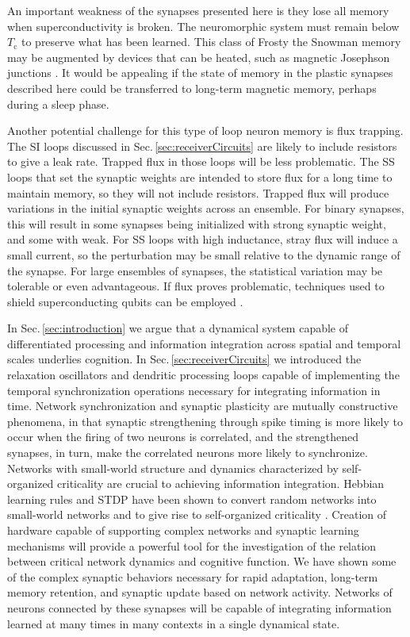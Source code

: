 \documentclass[twocolumn]{article}
\begin{document}
An important weakness of the synapses presented here is they lose all memory when superconductivity is broken. The neuromorphic system must remain below $T_{\mathrm{c}}$ to preserve what has been learned. This class of Frosty the Snowman memory may be augmented by devices that can be heated, such as magnetic Josephson junctions \cite{ru2016,scdo2017,scdo2018}. It would be appealing if the state of memory in the plastic synapses described here could be transferred to long-term magnetic memory, perhaps during a sleep phase.

Another potential challenge for this type of loop neuron memory is flux trapping. The SI loops discussed in Sec.\,\ref{sec:receiverCircuits} are likely to include resistors to give a leak rate. Trapped flux in those loops will be less problematic. The SS loops that set the synaptic weights are intended to store flux for a long time to maintain memory, so they will not include resistors. Trapped flux will produce variations in the initial synaptic weights across an ensemble. For binary synapses, this will result in some synapses being initialized with strong synaptic weight, and some with weak. For SS loops with high inductance, stray flux will induce a small current, so the perturbation may be small relative to the dynamic range of the synapse. For large ensembles of synapses, the statistical variation may be tolerable or even advantageous. If flux proves problematic, techniques used to shield superconducting qubits can be employed \cite{coch2011}.

In Sec.\,\ref{sec:introduction} we argue that a dynamical system capable of differentiated processing and information integration across spatial and temporal scales underlies cognition. In Sec.\,\ref{sec:receiverCircuits} we introduced the relaxation oscillators and dendritic processing loops capable of implementing the temporal synchronization operations necessary for integrating information in time. Network synchronization and synaptic plasticity are mutually constructive phenomena, in that synaptic strengthening through spike timing is more likely to occur when the firing of two neurons is correlated, and the strengthened synapses, in turn, make the correlated neurons more likely to synchronize. Networks with small-world structure \cite{wast1998,sp2010} and dynamics characterized by self-organized criticality are crucial to achieving information integration. Hebbian learning rules and STDP have been shown to convert random networks into small-world networks and to give rise to self-organized criticality \cite{siqu2007,rusp2011}. Creation of hardware capable of supporting complex networks and synaptic learning mechanisms will provide a powerful tool for the investigation of the relation between critical network dynamics and cognitive function. We have shown some of the complex synaptic behaviors necessary for rapid adaptation, long-term memory retention, and synaptic update based on network activity. Networks of neurons connected by these synapses will be capable of integrating information learned at many times in many contexts in a single dynamical state.
\end{document}
